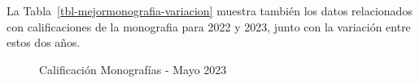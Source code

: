 \documentclass[
  letterpaper,
  DIV=11,
  numbers=noendperiod]{scrartcl}
\begin{document}
La Tabla~\ref{tbl-mejormonografia-variacion} muestra también los datos
relacionados con calificaciones de la monografia para 2022 y 2023, junto
con la variación entre estos dos años.

\begin{figure}

\begin{minipage}[t]{0.50\linewidth}

{\centering 


}

\end{minipage}%
%
\begin{minipage}[t]{0.50\linewidth}

{\centering 


}

\end{minipage}%

\caption{\label{fig-monografias}Calificación Monografías - Mayo 2023}

\end{figure}
\end{document}
